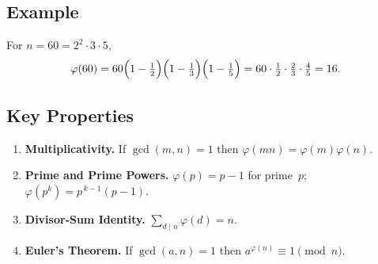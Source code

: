 \documentclass[12pt]{article}
\theoremstyle{definition} %
\theoremstyle{plain} %
\begin{document}
\subsection{Example}
For \(n=60=2^{2}\!\cdot 3 \cdot 5\),
\[
  \varphi(60)=60
     \Bigl(1-\tfrac12\Bigr)
     \Bigl(1-\tfrac13\Bigr)
     \Bigl(1-\tfrac15\Bigr)
  =60\cdot\tfrac12\cdot\tfrac23\cdot\tfrac45
  =16.
\]

\subsection{Key Properties}
\begin{enumerate}[label=\arabic*.]
  \item \textbf{Multiplicativity.} If \(\gcd(m,n)=1\) then
        \(\varphi(mn)=\varphi(m)\varphi(n)\).
  \item \textbf{Prime and Prime Powers.}
        \(\varphi(p)=p-1\) for prime~\(p\);\;
        \(\varphi(p^{k})=p^{\,k-1}(p-1)\).
  \item \textbf{Divisor‑Sum Identity.}\;
        \(\displaystyle\sum_{d\mid n}\varphi(d)=n\).
  \item \textbf{Euler’s Theorem.} If \(\gcd(a,n)=1\) then
        \(a^{\varphi(n)}\equiv 1\pmod n\).
\end{enumerate}
\end{document}
